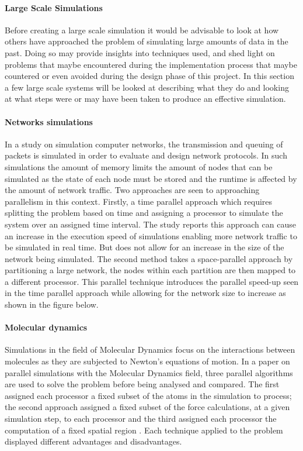 \documentclass[main.tex]{subfiles}
\begin{document}
{{\paragraph{Large Scale Simulations} Before creating a large scale simulation it would be advisable to look at how others have approached the problem of simulating large amounts of data in the past. Doing so may provide insights into techniques used, and shed light on problems that maybe encountered during the implementation process that maybe countered or even avoided during the design phase of this project. In this section a few large scale systems will be looked at describing what they do and looking at what steps were or may have been taken to produce an effective simulation.

\paragraph{Networks simulations} In a study on simulation computer networks\cite{Fujimoto2003}, the transmission and queuing of packets is simulated in order to evaluate and design network protocols. In such simulations the amount of memory limits the amount of nodes that can be simulated as the state of each node must be stored and the runtime is affected by the amount of network traffic. Two approaches are seen to approaching parallelism in this context. Firstly, a time parallel approach which requires splitting the problem based on time and assigning a processor to simulate the system over an assigned time interval. The study reports this approach can cause an increase in the execution speed of simulations enabling more network traffic to be simulated in real time. But does not allow for an increase in the size of the network being simulated. The second method takes a space-parallel approach by partitioning a large network, the nodes within each partition are then mapped to a different processor. This parallel technique introduces the parallel speed-up seen in the time parallel approach while allowing for the network size to increase as shown in the figure below.


\paragraph{Molecular dynamics} Simulations in the field of Molecular Dynamics focus on the interactions between molecules as they are subjected to Newton's equations of motion. In a paper on parallel simulations with the Molecular Dynamics field, three parallel algorithms are used to solve the problem before being analysed and compared. The ﬁrst assigned each processor a ﬁxed subset of the atoms in the simulation to process; the second approach assigned a ﬁxed subset of the force calculations, at a given simulation step, to each processor and the third assigned each processor the computation of a ﬁxed spatial region \cite{Plimpton1995}. Each technique applied to the problem displayed different advantages and disadvantages.

}}
\end{document}
